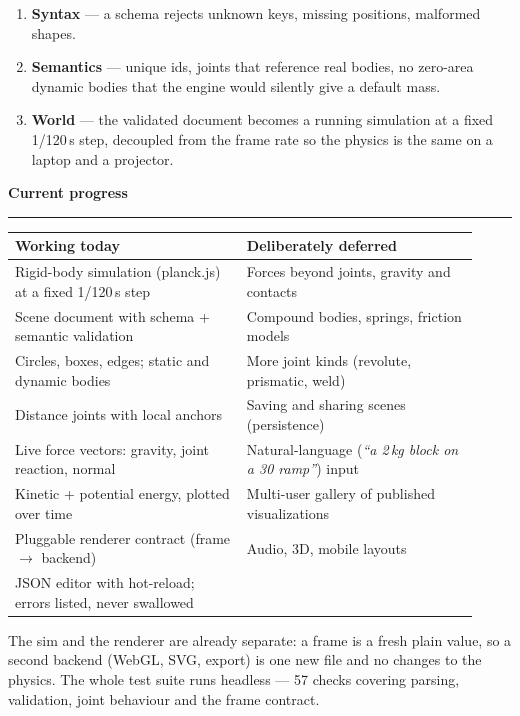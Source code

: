 \documentclass[10pt,a4paper]{article}
\newcommand{\sectionhead}[1]{%
  \vspace{7pt}%
  {\color{accent}\bfseries\large #1}\\[-6pt]
  {\color{accent}\rule{\linewidth}{0.7pt}}\vspace{3pt}%
}
\begin{document}
\begin{enumerate}[leftmargin=1.4em,itemsep=1pt,topsep=2pt,parsep=0pt]
  \item \textbf{Syntax} --- a schema rejects unknown keys, missing positions, malformed shapes.
  \item \textbf{Semantics} --- unique ids, joints that reference real bodies, no zero-area
  dynamic bodies that the engine would silently give a default mass.
  \item \textbf{World} --- the validated document becomes a running simulation at a fixed
  1/120\,s step, decoupled from the frame rate so the physics is the same on a laptop and a
  projector.
\end{enumerate}

\newpage

\sectionhead{Current progress}

\begin{center}
\small
\begin{tabular}{@{}p{0.46\linewidth}p{0.46\linewidth}@{}}
\toprule
\textbf{Working today} & \textbf{Deliberately deferred}\\
\midrule
Rigid-body simulation (planck.js) at a fixed 1/120\,s step &
Forces beyond joints, gravity and contacts\\
Scene document with schema + semantic validation &
Compound bodies, springs, friction models\\
Circles, boxes, edges; static and dynamic bodies &
More joint kinds (revolute, prismatic, weld)\\
Distance joints with local anchors &
Saving and sharing scenes (persistence)\\
Live force vectors: gravity, joint reaction, normal &
Natural-language (\emph{``a 2\,kg block on a 30\textdegree{} ramp''}) input\\
Kinetic + potential energy, plotted over time &
Multi-user gallery of published visualizations\\
Pluggable renderer contract (frame $\to$ backend) &
Audio, 3D, mobile layouts\\
JSON editor with hot-reload; errors listed, never swallowed &
\\
\bottomrule
\end{tabular}
\end{center}

\vspace{2pt}
{\small\color{soft}The sim and the renderer are already separate: a frame is a fresh plain
value, so a second backend (WebGL, SVG, export) is one new file and no changes to the physics.
The whole test suite runs headless --- 57 checks covering parsing, validation, joint
behaviour and the frame contract.}
\end{document}
